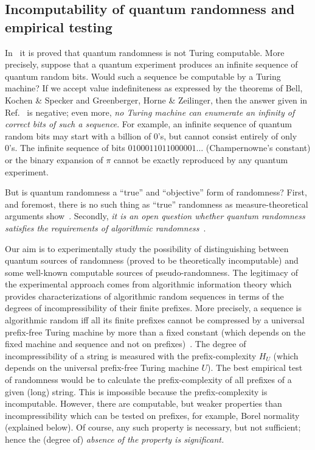 \documentclass[%
 preprint,
 showpacs,
 showkeys,
 preprintnumbers,
 amsmath,amssymb,
 aps,
 prl,
  longbibliography,
 ]{revtex4-1}
\begin{document}
\subsection{Incomputability of quantum randomness and empirical testing}
\label{incomput}

In~\cite{2008-cal-svo} it is proved that quantum randomness is not Turing computable.
More precisely, suppose that a quantum experiment produces an infinite sequence of quantum random bits.
Would such a sequence be computable by a Turing machine?
If we accept value indefiniteness as expressed by the theorems of Bell, Kochen \& Specker and Greenberger, Horne \& Zeilinger,
then the answer given in Ref.~\cite{2008-cal-svo} is negative;
even more, {\it no Turing machine can enumerate an infinity of correct bits of such a sequence}.
For example, an infinite sequence of quantum random bits may start with a billion of 0's,
but cannot consist entirely of only 0's. The infinite sequence of  bits $0100011011000001\ldots$
(Champernowne's constant) or the binary expansion of $\pi$ cannot be exactly reproduced by any quantum experiment.



But is quantum randomness a ``true'' and ``objective'' form of randomness?
First, and foremost, there is no such thing as ``true'' randomness as measure-theoretical arguments show~\cite{calude:02}.
Secondly, {\it  it is an open question  whether quantum randomness satisfies the
requirements of algorithmic randomness}~\cite{calude:02}.



Our aim is to experimentally study the possibility of distinguishing between
quantum sources of randomness (proved to be theoretically incomputable) and  some well-known computable
sources of  pseudo-randomness.
 The  legitimacy of the experimental approach comes from algorithmic information theory
which provides characterizations of algorithmic random sequences in terms of the degrees of incompressibility of their finite prefixes.
More precisely, a sequence is algorithmic random iff  all its finite prefixes cannot be compressed by a universal prefix-free Turing machine by more than a fixed constant
(which depends on the fixed machine and sequence and not on prefixes)~\cite{calude:02}.
The degree of incompressibility of a string is measured with the prefix-complexity $H_{U}$ (which depends on the universal prefix-free Turing machine
$U$). The best empirical test of randomness would be to calculate the prefix-complexity of all prefixes of  a given (long) string.
This is impossible because the prefix-complexity is incomputable.
However, there are computable, but weaker properties than incompressibility which can be tested on prefixes, for example, Borel normality (explained below).
Of course, any such property is necessary, but not sufficient; hence  the (degree of) {\it absence of the property is significant.}
\end{document}

